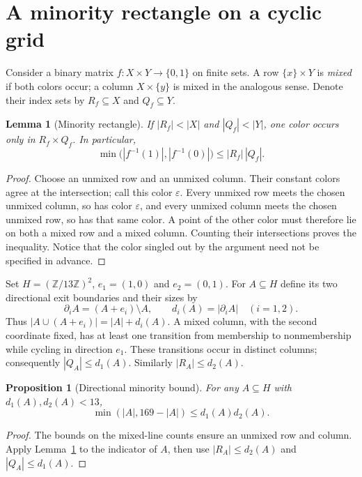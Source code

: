 \documentclass[11pt,a4paper]{article}
\newtheorem{lemma}[theorem]{Lemma}
\newtheorem{proposition}[theorem]{Proposition}
\theoremstyle{definition}
\theoremstyle{remark}
\newcommand{\Z}{\mathbb Z}
\begin{document}
\section{A minority rectangle on a cyclic grid}
Consider a binary matrix $f:X\times Y\to\{0,1\}$ on finite sets.
A row $\{x\}\times Y$ is \emph{mixed} if both colors occur; a column
$X\times\{y\}$ is mixed in the analogous sense. Denote their index sets by
$R_f\subseteq X$ and $Q_f\subseteq Y$.

\begin{lemma}[Minority rectangle]\label{lem:minority}
If $|R_f|<|X|$ and $|Q_f|<|Y|$, one color occurs only in
$R_f\times Q_f$. In particular,
\[
 \min\bigl(|f^{-1}(1)|,|f^{-1}(0)|\bigr)\le |R_f|\,|Q_f|.
\]
\end{lemma}
\begin{proof}
Choose an unmixed row and an unmixed column. Their constant colors agree at
the intersection; call this color $\varepsilon$. Every unmixed row meets the
chosen unmixed column, so has color $\varepsilon$, and every unmixed column
meets the chosen unmixed row, so has that same color. A point of the other
color must therefore lie on both a mixed row and a mixed column. Counting
their intersections proves the inequality. Notice that the color singled
out by the argument need not be specified in advance.
\end{proof}

Set $H=(\Z/13\Z)^2$, $e_1=(1,0)$ and $e_2=(0,1)$. For $A\subseteq H$
define its two directional exit boundaries and their sizes by
\[
 \partial_i A=(A+e_i)\setminus A,
 \qquad d_i(A)=|\partial_i A| \quad (i=1,2).
\]
Thus $|A\cup(A+e_i)|=|A|+d_i(A)$. A mixed column, with the second
coordinate fixed, has at least one transition from membership to
nonmembership while cycling in direction $e_1$. These transitions occur
in distinct columns; consequently $|Q_A|\le d_1(A)$. Similarly
$|R_A|\le d_2(A)$.

\begin{proposition}[Directional minority bound]\label{prop:boundary}
For any $A\subseteq H$ with $d_1(A),d_2(A)<13$,
\begin{equation}\label{eq:minority}
 \min(|A|,169-|A|)\le d_1(A)d_2(A).
\end{equation}
\end{proposition}
\begin{proof}
The bounds on the mixed-line counts ensure an unmixed row and column.
Apply Lemma~\ref{lem:minority} to the indicator of $A$, then use
$|R_A|\le d_2(A)$ and $|Q_A|\le d_1(A)$.
\end{proof}
\end{document}
